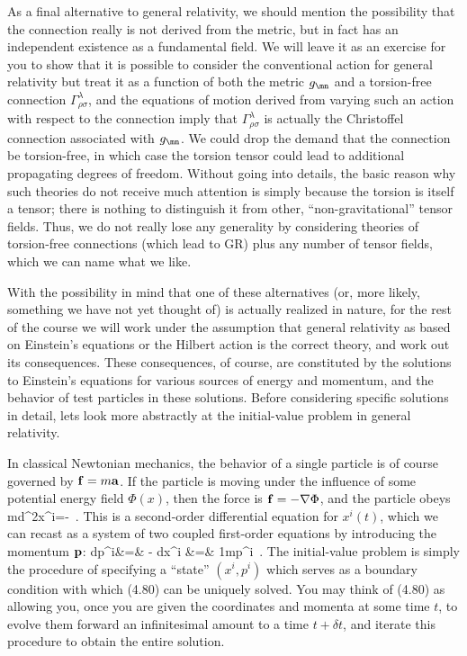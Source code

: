 \documentclass[12pt]{article}
\begin{document}
As a final alternative to general relativity, we should mention the
possibility that the connection really is not derived from the metric,
but in fact has an independent existence as a fundamental field.
We will leave it as an exercise for you to show that it is possible
to consider the conventional action for general relativity but treat
it as a function of both the metric $g_\mn$ and a torsion-free connection
$\Gamma^\lambda_{\rho\sigma}$,
and the equations of motion derived from varying such an action with
respect to the connection imply that $\Gamma^\lambda_{\rho\sigma}$ is
actually the Christoffel connection associated with $g_\mn$.  We could
drop the demand that the connection be torsion-free, in which case the
torsion tensor could lead to additional propagating degrees of freedom.
Without going into details, the basic reason why such theories do not
receive much attention is simply because the torsion is itself a tensor;
there is nothing to distinguish it from other, ``non-gravitational''
tensor fields.  Thus, we do not really lose any generality by considering
theories of torsion-free connections (which lead to GR) plus any number
of tensor fields, which we can name what we like.

With the possibility in mind that one of these alternatives (or, more
likely, something we have not yet thought of) is actually realized in
nature, for the rest of the course we will work under the assumption
that general relativity as based on Einstein's equations or the Hilbert
action is the correct theory, and work out its consequences.  These
consequences, of course, are constituted by the solutions to Einstein's
equations for various sources of energy and momentum, and the behavior
of test particles in these solutions.  Before considering specific
solutions in detail, lets look more abstractly at the initial-value
problem in general relativity.

In classical Newtonian mechanics, the behavior of a single particle 
is of course governed by ${\bf f} = m{\bf a}$.  If the particle is
moving under the influence of some potential energy field $\Phi(x)$,
then the force is ${\bf f} = -\nabla \Phi$, and the particle obeys
\be
  m{{d^2x^i}}=-\Phi\ .\label{4.79}
\ee
This is a second-order differential equation for $x^i(t)$, which we
can recast as a system of two coupled first-order equations by 
introducing the momentum ${\bf p}$:
\bea
  {{dp^i}}&=& -\Phi\cr
  {{dx^i}} &=&  {1\over m}p^i\ . \label{4.80}
\eea
The initial-value problem is simply the procedure of specifying a
``state'' $(x^i,p^i)$ which serves as a boundary condition with which
(4.80) can be uniquely solved.  You may think of (4.80) as allowing you,
once you are given the coordinates and momenta at some time $t$, to
evolve them forward an infinitesimal amount to a time $t+\delta t$,
and iterate this procedure to obtain the entire solution.
\end{document}
